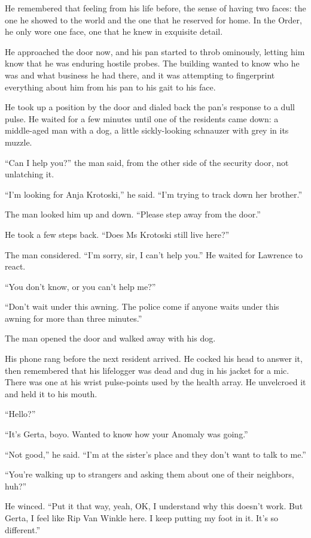 He remembered that feeling from his life before, the sense of having 
two faces: the one he showed to the world and the one that he reserved 
for home. In the Order, he only wore one face, one that he knew in 
exquisite detail.

He approached the door now, and his pan started to throb ominously, 
letting him know that he was enduring hostile probes. The building 
wanted to know who he was and what business he had there, and it was 
attempting to fingerprint everything about him from his pan to his gait 
to his face.

He took up a position by the door and dialed back the pan's response to 
a dull pulse. He waited for a few minutes until one of the residents 
came down: a middle-aged man with a dog, a little sickly-looking 
schnauzer with grey in its muzzle.

“Can I help you?” the man said, from the other side of the security 
door, not unlatching it.

“I'm looking for Anja Krotoski,” he said. “I'm trying to track 
down her brother.”

The man looked him up and down. “Please step away from the door.”

He took a few steps back. “Does Ms Krotoski still live here?”

The man considered. “I'm sorry, sir, I can't help you.” He waited 
for Lawrence to react.

“You don't know, or you can't help me?”

“Don't wait under this awning. The police come if anyone waits under 
this awning for more than three minutes.”

The man opened the door and walked away with his dog.

\tb

His phone rang before the next resident arrived. He cocked his head to 
answer it, then remembered that his lifelogger was dead and dug in his 
jacket for a mic. There was one at his wrist pulse-points used by the 
health array. He unvelcroed it and held it to his mouth.

“Hello?”

“It's Gerta, boyo. Wanted to know how your Anomaly was going.”

“Not good,” he said. “I'm at the sister's place and they don't 
want to talk to me.”

“You're walking up to strangers and asking them about one of their 
neighbors, huh?”

He winced. “Put it that way, yeah, OK, I understand why this doesn't 
work. But Gerta, I feel like Rip Van Winkle here. I keep putting my 
foot in it. It's so different.”

